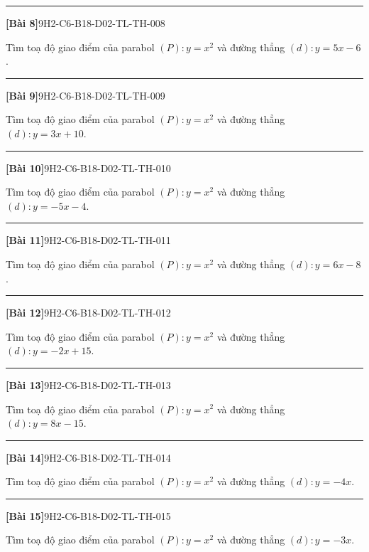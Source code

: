 \documentclass[12pt,a4paper]{article}
\newif\ifloigiai
\newenvironment{cauhoi}[2]{%
  \par\medskip\noindent\rule{\textwidth}{0.4pt}\par\nopagebreak
  \noindent\textbf{[#1]}\hfill{\scriptsize\ttfamily #2}\par\nopagebreak\smallskip}{\par}
\newcommand{\loigiai}[1]{\ifloigiai\par\smallskip\noindent\textit{Lời giải.} #1\par\fi}
\begin{document}
\begin{cauhoi}{Bài 8}{9H2-C6-B18-D02-TL-TH-008}
Tìm toạ độ giao điểm của parabol $(P): y=x^{2}$ và đường thẳng $(d): y=5x-6$.
\loigiai{Phương trình hoành độ giao điểm: $x^{2}=5x-6$ hay $x^{2}-5x+6=0$, có hai nghiệm $x=2$ và $x=3$. Giao điểm là $(2;4)$ và $(3;9)$.}
\end{cauhoi}
\begin{cauhoi}{Bài 9}{9H2-C6-B18-D02-TL-TH-009}
Tìm toạ độ giao điểm của parabol $(P): y=x^{2}$ và đường thẳng $(d): y=3x+10$.
\loigiai{Phương trình hoành độ giao điểm: $x^{2}=3x+10$ hay $x^{2}-3x-10=0$, có hai nghiệm $x=-2$ và $x=5$. Giao điểm là $(-2;4)$ và $(5;25)$.}
\end{cauhoi}
\begin{cauhoi}{Bài 10}{9H2-C6-B18-D02-TL-TH-010}
Tìm toạ độ giao điểm của parabol $(P): y=x^{2}$ và đường thẳng $(d): y=-5x-4$.
\loigiai{Phương trình hoành độ giao điểm: $x^{2}=-5x-4$ hay $x^{2}+5x+4=0$, có hai nghiệm $x=-4$ và $x=-1$. Giao điểm là $(-4;16)$ và $(-1;1)$.}
\end{cauhoi}
\begin{cauhoi}{Bài 11}{9H2-C6-B18-D02-TL-TH-011}
Tìm toạ độ giao điểm của parabol $(P): y=x^{2}$ và đường thẳng $(d): y=6x-8$.
\loigiai{Phương trình hoành độ giao điểm: $x^{2}=6x-8$ hay $x^{2}-6x+8=0$, có hai nghiệm $x=2$ và $x=4$. Giao điểm là $(2;4)$ và $(4;16)$.}
\end{cauhoi}
\begin{cauhoi}{Bài 12}{9H2-C6-B18-D02-TL-TH-012}
Tìm toạ độ giao điểm của parabol $(P): y=x^{2}$ và đường thẳng $(d): y=-2x+15$.
\loigiai{Phương trình hoành độ giao điểm: $x^{2}=-2x+15$ hay $x^{2}+2x-15=0$, có hai nghiệm $x=-5$ và $x=3$. Giao điểm là $(-5;25)$ và $(3;9)$.}
\end{cauhoi}
\begin{cauhoi}{Bài 13}{9H2-C6-B18-D02-TL-TH-013}
Tìm toạ độ giao điểm của parabol $(P): y=x^{2}$ và đường thẳng $(d): y=8x-15$.
\loigiai{Phương trình hoành độ giao điểm: $x^{2}=8x-15$ hay $x^{2}-8x+15=0$, có hai nghiệm $x=3$ và $x=5$. Giao điểm là $(3;9)$ và $(5;25)$.}
\end{cauhoi}
\begin{cauhoi}{Bài 14}{9H2-C6-B18-D02-TL-TH-014}
Tìm toạ độ giao điểm của parabol $(P): y=x^{2}$ và đường thẳng $(d): y=-4x$.
\loigiai{Phương trình hoành độ giao điểm: $x^{2}=-4x$ hay $x^{2}+4x+0=0$, có hai nghiệm $x=-4$ và $x=0$. Giao điểm là $(-4;16)$ và $(0;0)$.}
\end{cauhoi}
\begin{cauhoi}{Bài 15}{9H2-C6-B18-D02-TL-TH-015}
Tìm toạ độ giao điểm của parabol $(P): y=x^{2}$ và đường thẳng $(d): y=-3x$.
\loigiai{Phương trình hoành độ giao điểm: $x^{2}=-3x$ hay $x^{2}+3x+0=0$, có hai nghiệm $x=-3$ và $x=0$. Giao điểm là $(-3;9)$ và $(0;0)$.}
\end{cauhoi}
\end{document}

